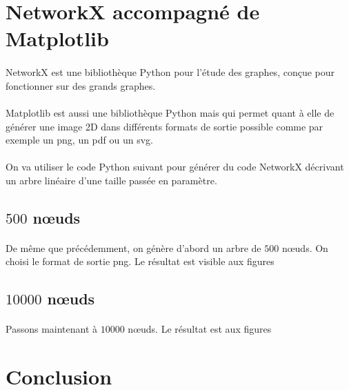 	\section{NetworkX accompagné de Matplotlib}
	
\paragraph{}NetworkX est une bibliothèque Python pour l'étude des graphes, conçue pour fonctionner sur des grands graphes.

\paragraph{}Matplotlib est aussi une bibliothèque Python mais qui permet quant à elle de générer une image 2D dans différents formats de sortie possible comme par exemple un png, un pdf ou un svg.

\paragraph{}On va utiliser le code Python suivant pour générer du code NetworkX décrivant un arbre linéaire d'une taille passée en paramètre.


		\subsection{$500$ n\oe uds}
\paragraph{}De même que précédemment, on génère d'abord un arbre de $500$ n\oe uds. On choisi le format de sortie png. Le résultat est visible aux figures %
		
		\subsection{$10000$ n\oe uds}
\paragraph{}Passons maintenant à $10000$ n\oe uds. Le résultat est aux figures %
	
	\section{Conclusion}
	
